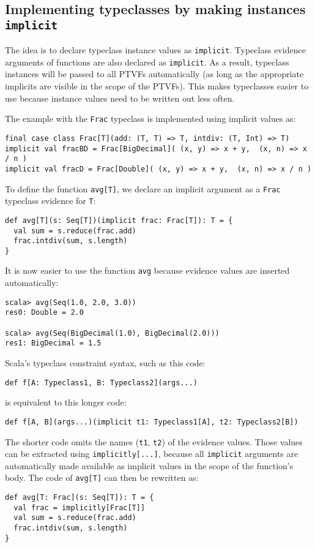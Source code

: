 \subsection{Implementing typeclasses by making instances \texttt{implicit} }

The idea is to declare typeclass instance values as \lstinline!implicit!.
Typeclass evidence arguments of functions are also declared as \lstinline!implicit!.
As a result, typeclass instances will be passed to all PTVFs automatically
(as long as the appropriate implicits are visible in the scope of
the PTVFs). This makes typeclasses easier to use because instance
values need to be written out less often.

The example with the \lstinline!Frac! typeclass is implemented using
implicit values as:
\begin{lstlisting}
final case class Frac[T](add: (T, T) => T, intdiv: (T, Int) => T)
implicit val fracBD = Frac[BigDecimal]( (x, y) => x + y,  (x, n) => x / n )
implicit val fracD = Frac[Double]( (x, y) => x + y,  (x, n) => x / n )
\end{lstlisting}
To define the function \lstinline!avg[T]!, we declare an implicit
argument as a \lstinline!Frac! typeclass evidence for \lstinline!T!:
\begin{lstlisting}
def avg[T](s: Seq[T])(implicit frac: Frac[T]): T = {
  val sum = s.reduce(frac.add)
  frac.intdiv(sum, s.length)
}
\end{lstlisting}
It is now easier to use the function \lstinline!avg! because evidence
values are inserted automatically:
\begin{lstlisting}
scala> avg(Seq(1.0, 2.0, 3.0))
res0: Double = 2.0

scala> avg(Seq(BigDecimal(1.0), BigDecimal(2.0)))
res1: BigDecimal = 1.5
\end{lstlisting}

Scala\textsf{'}s typeclass constraint syntax, such as this code: 
\begin{lstlisting}
def f[A: Typeclass1, B: Typeclass2](args...)
\end{lstlisting}
is equivalent to this longer code:
\begin{lstlisting}
def f[A, B](args...)(implicit t1: Typeclass1[A], t2: Typeclass2[B])
\end{lstlisting}
The shorter code omits the names (\lstinline!t1!, \lstinline!t2!)
of the evidence values. Those values can be extracted using \lstinline!implicitly[...]!,
because all \lstinline!implicit! arguments are automatically made
available as implicit values in the scope of the function\textsf{'}s body.
The code of \lstinline!avg[T]! can then be rewritten as:
\begin{lstlisting}
def avg[T: Frac](s: Seq[T]): T = {
  val frac = implicitly[Frac[T]]
  val sum = s.reduce(frac.add)
  frac.intdiv(sum, s.length)
}
\end{lstlisting}

